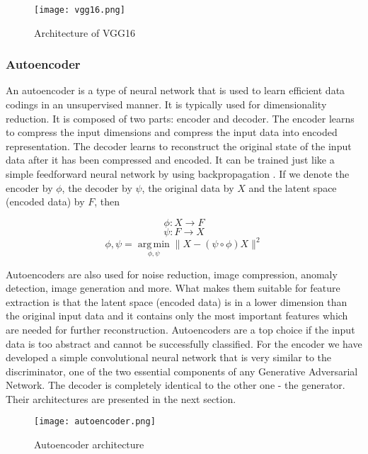 \documentclass{article}
\begin{document}
\begin{figure}[ht]
    \centering
    \texttt{[image: vgg16.png]}
    \caption{Architecture of VGG16}
    \label{fig:vgg16}
\end{figure}

\pagebreak

\subsubsection{Autoencoder}
\label{section:autoencoder}
An autoencoder is a type of neural network that is used to learn efficient data codings in an unsupervised manner. It is typically used for dimensionality reduction. It is composed of two parts: encoder and decoder. The encoder learns to compress the input dimensions and compress the input data into encoded representation. The decoder learns to reconstruct the original state of the input data after it has been compressed and encoded. It can be trained just like a simple feedforward neural network by using backpropagation \cite{Rumelhart:1986we}. If we denote the encoder by $\phi$, the decoder by $\psi$, the original data by $X$ and the latent space (encoded data) by $F$, then

\begin{equation}
    \phi:X \rightarrow F
\end{equation}
\begin{equation}
    \psi:F \rightarrow X
\end{equation}
\begin{equation}
\phi,\psi = \operatorname*{arg\,min}_{\phi,\psi} {\parallel}X - (\psi\circ\phi)X{\parallel}^2
\end{equation}

Autoencoders are also used for noise reduction, image compression, anomaly detection, image generation and more. What makes them suitable for feature extraction is that the latent space (encoded data) is in a lower dimension than the original input data and it contains only the most important features which are needed for further reconstruction. Autoencoders are a top choice if the input data is too abstract and cannot be successfully classified. For the encoder we have developed a simple convolutional neural network that is very similar to the discriminator, one of the two essential components of any Generative Adversarial Network. The decoder is completely identical to the other one - the generator. Their architectures are presented in the next section.

\begin{figure}[ht]
    \centering
    \texttt{[image: autoencoder.png]}
    \caption{Autoencoder architecture}
    \label{fig:autoencoder}
\end{figure}
\end{document}
